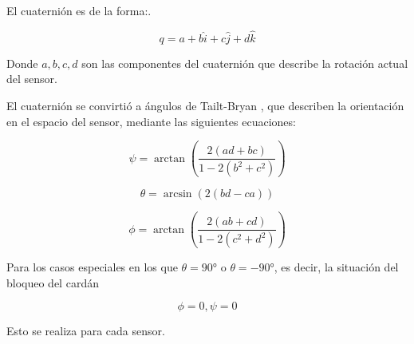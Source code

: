 El cuaternión es de la forma:.

\begin{equation}
	q = a + b\hat{i} + c\hat{j} + d\hat{k}
	\label{eq:eqcuaternion}
\end{equation}

Donde $a, b, c, d$ son las componentes del cuaternión que describe la rotación actual del sensor.

El cuaternión se convirtió a ángulos de Tailt-Bryan \cite{tailtbryan}, que describen la orientación en el espacio del sensor, mediante las siguientes ecuaciones:

\begin{equation}
	\psi = \arctan{\left( \frac{2(ad + bc)}{1 - 2(b^2 + c^2)} \right)}
	\label{eq:yaw}
\end{equation}

\begin{equation}
	\theta = \arcsin{\left( 2(bd - ca) \right)}
	\label{eq:pitch}
\end{equation}

\begin{equation}
	\phi = \arctan{\left( \frac{2(ab + cd)}{1 - 2(c^2 + d^2)} \right)}
	\label{eq:roll}
\end{equation}

Para los casos especiales en los que $\theta = 90°$ o $\theta = -90°$, es decir, la situación del bloqueo del cardán

\begin{equation}
	\phi = 0, \psi = 0
	\label{eq:especial}
\end{equation}

Esto se realiza para cada sensor.